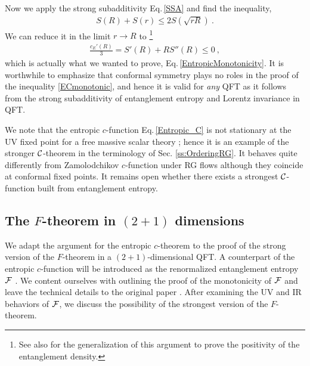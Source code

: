 Now we apply the strong subadditivity Eq.\,\eqref{SSA} and find the inequality,
\begin{align}\label{ECSSA}
 S(R) + S(r) \le 2 S\left(\sqrt{rR}\right)\ .
\end{align}
We can reduce it in the limit $r\to R$ to \cite{Casini:2004bw}\footnote{See also \textcite{Bhattacharya:2014vja} for the generalization of this argument to prove the positivity of the entanglement density.}
\begin{align}\label{ECmonotonic}
\frac{c_E'(R)}{3} = S'(R) + RS''(R) \le 0 \ ,
\end{align}
which is actually what we wanted to prove, Eq.\,\eqref{EntropicMonotonicity}.
It is worthwhile to emphasize that conformal symmetry plays no roles in the proof of the inequality \eqref{ECmonotonic}, and hence it is valid for \emph{any} QFT as it follows from the strong subadditivity of entanglement entropy and Lorentz invariance in QFT.


We note that the entropic $c$-function Eq.\,\eqref{Entropic_C} is not stationary at the UV fixed point for a free massive scalar theory \cite{Casini:2005zv}; hence it is an example of the stronger ${\cal C}$-theorem in the terminology of Sec. \ref{ss:OrderingRG}.
It behaves quite differently from Zamolodchikov $c$-function under RG flows although they coincide at conformal fixed points.
It remains open whether there exists a strongest ${\cal C}$-function built from entanglement entropy.


\subsection{The $F$-theorem in $(2+1)$ dimensions}\label{ss:Ftheorem}
We adapt the argument for the entropic $c$-theorem to the proof of the strong version of the $F$-theorem in a $(2+1)$-dimensional QFT.
A counterpart of the entropic $c$-function will be introduced as the renormalized entanglement entropy ${\cal F}$ \cite{Liu:2012eea}.
We content ourselves with outlining the proof of the monotonicity of ${\cal F}$ and leave the technical details to the original paper \cite{Casini:2012ei}.
After examining the UV and IR behaviors of ${\cal F}$, we discuss the possibility of the strongest version of the $F$-theorem.


